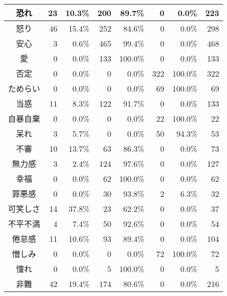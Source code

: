\documentclass[japanese]{jnlp_1.3c}
\begin{document}
\begin{table}[p]
\begin{center}
\begin{tabular}{|c||r|r|r|r|r|r||r|}
恐れ	&	23	&	10.3\%	&	200	&	89.7\%	&	0	&	0.0\%	&	223 \\ \hline
怒り	&	46	&	15.4\%	&	252	&	84.6\%	&	0	&	0.0\%	&	298 \\ \hline
安心	&	3	&	0.6\%	&	465	&	99.4\%	&	0	&	0.0\%	&	468 \\ \hline
愛	&	0	&	0.0\%	&	133	&	100.0\%	&	0	&	0.0\%	&	133 \\ \hline
否定	&	0	&	0.0\%	&	0	&	0.0\%	&	322	&	100.0\%	&	322 \\ \hline
ためらい	&	0	&	0.0\%	&	0	&	0.0\%	&	69	&	100.0\%	&	69 \\ \hline
当惑 	&	11	&	8.3\%	&	122	&	91.7\%	&	0	&	0.0\%	&	133 \\ \hline
自暴自棄 &	0	&	0.0\%	&	0	&	0.0\%	&	22	&	100.0\%	&	22 \\ \hline
呆れ 	&	3	&	5.7\%	&	0	&	0.0\%	&	50	&	94.3\%	&	53 \\ \hline
不審 	&	10	&	13.7\%	&	63	&	86.3\%	&	0	&	0.0\%	&	73 \\ \hline
無力感 	&	3	&	2.4\%	&	124	&	97.6\%	&	0	&	0.0\%	&	127 \\ \hline
幸福	&	0	&	0.0\%	&	62	&	100.0\%	&	0	&	0.0\%	&	62 \\ \hline
罪悪感 	&	0	&	0.0\%	&	30	&	93.8\%	&	2	&	6.3\%	&	32 \\ \hline
可笑しさ &	14	&	37.8\%	&	23	&	62.2\%	&	0	&	0.0\%	&	37 \\ \hline
不平不満 &	4	&	7.4\%	&	50	&	92.6\%	&	0	&	0.0\%	&	54 \\ \hline
倦怠感 	&	11	&	10.6\%	&	93	&	89.4\%	&	0	&	0.0\%	&	104 \\ \hline
憎しみ 	&	0	&	0.0\%	&	0	&	0.0\%	&	72	&	100.0\%	&	72 \\ \hline
憧れ 	&	0	&	0.0\%	&	5	&	100.0\%	&	0	&	0.0\%	&	5 \\ \hline
非難 	&	42	&	19.4\%	&	174	&	80.6\%	&	0	&	0.0\%	&	216 \\ \hline
\end{tabular}
\label{tb:result1}
\end{center}
\end{table}
\end{document}
